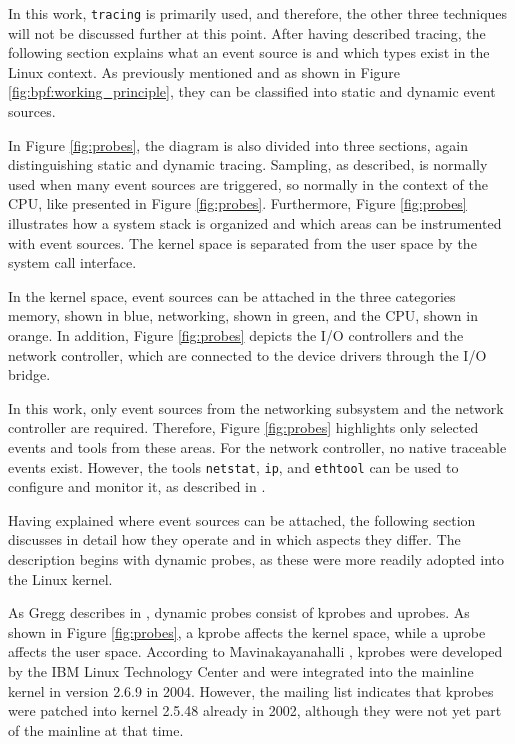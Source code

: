 In this work, \texttt{tracing} is primarily used, and therefore, the other three techniques will not be discussed further at this point.  
After having described tracing, the following section explains what an event source is and which types exist in the Linux context.  
As previously mentioned and as shown in Figure \ref{fig:bpf:working_principle}, they can be classified into static and dynamic event sources.

In Figure \ref{fig:probes}, the diagram is also divided into three sections, again distinguishing static and dynamic tracing.  
Sampling, as described, is normally used when many event sources are triggered, so normally in the context of the \ac{CPU}, like presented in Figure \ref{fig:probes}.  
Furthermore, Figure \ref{fig:probes} illustrates how a system stack is organized and which areas can be instrumented with event sources.  
The kernel space is separated from the user space by the system call interface.  

In the kernel space, event sources can be attached in the three categories memory, shown in blue, networking, shown in green, and the \ac{CPU}, shown in orange.  
In addition, Figure \ref{fig:probes} depicts the I/O controllers and the network controller, which are connected to the device drivers through the I/O bridge.  

In this work, only event sources from the networking subsystem and the network controller are required.  
Therefore, Figure \ref{fig:probes} highlights only selected events and tools from these areas.  
For the network controller, no native traceable events exist.  
However, the tools \texttt{netstat}, \texttt{ip}, and \texttt{ethtool} can be used to configure and monitor it, as described in \cite{ethtool,netstat,ip}.  

Having explained where event sources can be attached, the following section discusses in detail how they operate and in which aspects they differ.  
The description begins with dynamic probes, as these were more readily adopted into the Linux kernel.  

As Gregg describes in \cite[Chap. 1.2]{Gregg_2020}, dynamic probes consist of \acp{kprobe} and \acp{uprobe}.  
As shown in Figure \ref{fig:probes}, a \ac{kprobe} affects the kernel space, while a \ac{uprobe} affects the user space.  
According to Mavinakayanahalli \cite[p. 101]{Mavinakayanahalli_Panchamukhi_Keniston_Keshavamurthy_Hiramatsu_2006}, \acp{kprobe} were developed by the IBM Linux Technology Center and were integrated into the mainline kernel in version 2.6.9 in 2004.  
However, the mailing list \cite{kprobe_early} indicates that \acp{kprobe} were patched into kernel 2.5.48 already in 2002, although they were not yet part of the mainline at that time.  

